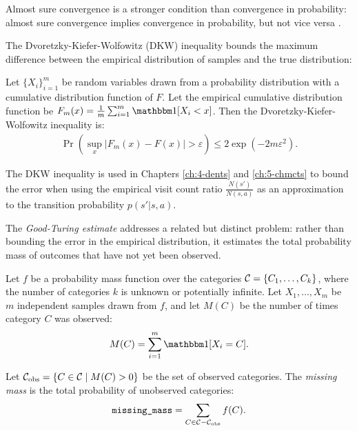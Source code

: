     Almost sure convergence is a stronger condition than convergence in probability: almost sure convergence implies convergence in probability, but not vice versa \cite{prob_and_measure}.




    The Dvoretzky-Kiefer-Wolfowitz (DKW) inequality \cite{dkw_inequality} bounds the maximum difference between the empirical distribution of samples and the true distribution:

    \begin{theorem} 
        \label{thrm:2:dkw_inequality}
        Let $\{X_i\}_{i=1}^m$ be random variables drawn from a probability distribution with a cumulative distribution function of $F$. Let the empirical cumulative distribution function be $F_m(x)=\frac{1}{m} \sum_{i=1}^m \one[X_i < x]$. Then the Dvoretzky-Kiefer-Wolfowitz inequality is:
        \begin{align}
            \Pr\left(\sup_x |F_m(x)-F(x)| > \varepsilon\right) \leq 2\exp\left(-2m\varepsilon^2\right).
        \end{align}
    \end{theorem}

    The DKW inequality is used in Chapters \ref{ch:4-dents} and \ref{ch:5-chmcts} to bound the error when using the empirical visit count ratio $\frac{N(s')}{N(s,a)}$ as an approximation to the transition probability $p(s'|s,a)$.



    The \textit{Good-Turing estimate} \cite{good_turing} addresses a related but distinct problem: rather than bounding the error in the empirical distribution, it estimates the total probability mass of outcomes that have not yet been observed.

    Let $f$ be a probability mass function over the categories $\mathcal{C}=\{C_1,\ldots,C_k\}$, where the number of categories $k$ is unknown or potentially infinite. Let $X_1,\ldots,X_m$ be $m$ independent samples drawn from $f$, and let $M(C)$ be the number of times category $C$ was observed:
    \begin{align}
        M(C) = \sum_{i=1}^m \one[X_i=C].
    \end{align}

    Let $\mathcal{C}_{\textnormal{obs}} = \{C\in\mathcal{C} \mid M(C)>0\}$ be the set of observed categories. The \textit{missing mass} is the total probability of unobserved categories:
    \begin{align}
        {\textnormal{\texttt{missing\_mass}}} = \sum_{C\in\mathcal{C} - \mathcal{C}_{\textnormal{obs}}} f(C).
    \end{align}
    
